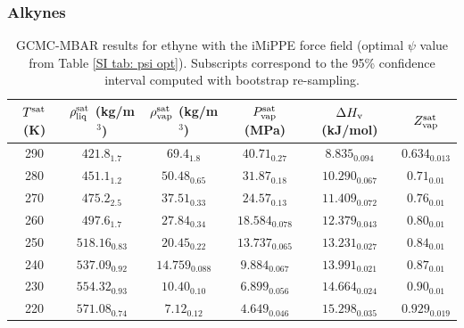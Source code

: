\documentclass[journal=jctc,manuscript=article]{achemso}
\begin{document}
\newpage
\clearpage

\subsubsection{Alkynes}


\begin{table}[htb!]
	\caption{GCMC-MBAR results for ethyne with the iMiPPE force field (optimal $\psi$ value from Table \ref{SI tab: psi opt}). Subscripts correspond to the 95\% confidence interval computed with bootstrap re-sampling.}
	\begin{center}
		\begin{tabular}{|c|c|c|c|c|c|}
			\hline
			$T^{\rm sat}$ (K) & $\rho_{\rm liq}^{\rm sat}$ (kg/m$^3$) & $\rho_{\rm vap}^{\rm sat}$ (kg/m$^3$) & $P_{\rm vap}^{\rm sat}$ (MPa) & $\Delta H_{\rm v}$ (kJ/mol) & $Z_{\rm vap}^{\rm sat}$ \\ \hline
			290 & $421.8_{1.7}$ & $69.4_{1.8}$ & $40.71_{0.27}$ & $8.835_{0.094}$ & $0.634_{0.013}$ \\
			280 & $451.1_{1.2}$ & $50.48_{0.65}$ & $31.87_{0.18}$ & $10.290_{0.067}$ & $0.71_{0.01}$ \\
			270 & $475.2_{2.5}$ & $37.51_{0.33}$ & $24.57_{0.13}$ & $11.409_{0.072}$ & $0.76_{0.01}$ \\
			260 & $497.6_{1.7}$ & $27.84_{0.34}$ & $18.584_{0.078}$ & $12.379_{0.043}$ & $0.80_{0.01}$ \\
			250 & $518.16_{0.83}$ & $20.45_{0.22}$ & $13.737_{0.065}$ & $13.231_{0.027}$ & $0.84_{0.01}$ \\
			240 & $537.09_{0.92}$ & $14.759_{0.088}$ & $9.884_{0.067}$ & $13.991_{0.021}$ & $0.87_{0.01}$ \\
			230 & $554.32_{0.93}$ & $10.40_{0.10}$ & $6.899_{0.056}$ & $14.664_{0.024}$ & $0.90_{0.01}$ \\
			220 & $571.08_{0.74}$ & $7.12_{0.12}$ & $4.649_{0.046}$ & $15.298_{0.035}$ & $0.929_{0.019}$ \\
			\hline
		\end{tabular}
	\end{center}
\end{table}
\end{document}

